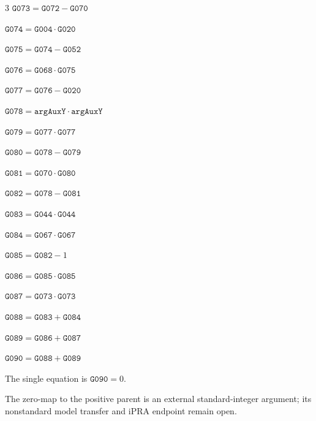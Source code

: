 \documentclass[10pt]{article}
\begin{document}
\begin{multicols}{3}
\noindent $\mathtt{G073}=\mathtt{G072}-\mathtt{G070}$\par
\noindent $\mathtt{G074}=\mathtt{G004}\cdot \mathtt{G020}$\par
\noindent $\mathtt{G075}=\mathtt{G074}-\mathtt{G052}$\par
\noindent $\mathtt{G076}=\mathtt{G068}\cdot \mathtt{G075}$\par
\noindent $\mathtt{G077}=\mathtt{G076}-\mathtt{G020}$\par
\noindent $\mathtt{G078}=\mathtt{argAuxY}\cdot \mathtt{argAuxY}$\par
\noindent $\mathtt{G079}=\mathtt{G077}\cdot \mathtt{G077}$\par
\noindent $\mathtt{G080}=\mathtt{G078}-\mathtt{G079}$\par
\noindent $\mathtt{G081}=\mathtt{G070}\cdot \mathtt{G080}$\par
\noindent $\mathtt{G082}=\mathtt{G078}-\mathtt{G081}$\par
\noindent $\mathtt{G083}=\mathtt{G044}\cdot \mathtt{G044}$\par
\noindent $\mathtt{G084}=\mathtt{G067}\cdot \mathtt{G067}$\par
\noindent $\mathtt{G085}=\mathtt{G082}-1$\par
\noindent $\mathtt{G086}=\mathtt{G085}\cdot \mathtt{G085}$\par
\noindent $\mathtt{G087}=\mathtt{G073}\cdot \mathtt{G073}$\par
\noindent $\mathtt{G088}=\mathtt{G083}+\mathtt{G084}$\par
\noindent $\mathtt{G089}=\mathtt{G086}+\mathtt{G087}$\par
\noindent $\mathtt{G090}=\mathtt{G088}+\mathtt{G089}$\par
\end{multicols}
The single equation is $\boxed{\mathtt{G090}=0}$.
\par\small The zero-map to the positive parent is an external standard-integer argument; its nonstandard model transfer and iPRA endpoint remain open.
\end{document}
